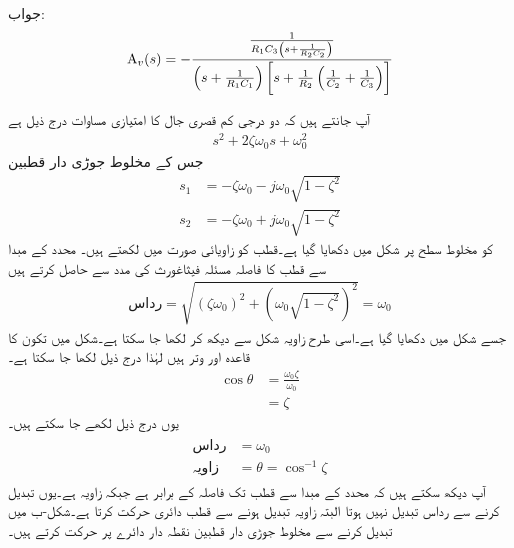 جواب:
\begin{align*}
{\ensuremath{{\textup{A}}}}_v(s)=-\frac{\frac{1}{R_1 C_3 \left(s+\frac{1}{R_2 C_2}\right)}}{\left(s+\frac{1}{R_1C_1}\right)\left[s+\frac{1}{R_2}\left(\frac{1}{C_2}+\frac{1}{C_3}\right)\right]}
\end{align*}

آپ جانتے ہیں کہ دو درجی کم قصری جال کا امتیازی مساوات درج ذیل ہے
\begin{align*}
s^2+2\zeta \omega_0 s+\omega_0^2
\end{align*}
جس کے مخلوط جوڑی دار قطبین
\begin{align*}
s_1&=-\zeta \omega_0-j\omega_0 \sqrt{1-\zeta^2}\\
s_2&=-\zeta \omega_0+j\omega_0 \sqrt{1-\zeta^2}
\end{align*}
کو مخلوط سطح پر شکل  میں دکھایا گیا ہے۔قطب  کو زاویائی صورت میں لکھتے ہیں۔ محدد کے مبدا  سے قطب کا فاصلہ مسئلہ فیثاغورث کی مدد سے حاصل کرتے ہیں
\begin{align*}
\text{رداس}=\sqrt{(\zeta \omega_0)^2+\left(\omega_0\sqrt{1-\zeta^2}\right)^2}=\omega_0
\end{align*}
جسے شکل میں   دکھایا گیا ہے۔اسی طرح زاویہ  شکل سے دیکھ کر لکھا جا سکتا ہے۔شکل میں تکون کا قاعدہ  اور وتر  ہیں لہٰذا درج ذیل لکھا جا سکتا ہے۔
\begin{align*}
\cos \theta&=\frac{\omega_0 \zeta}{\omega_0}\\
&=\zeta
\end{align*}
یوں درج ذیل لکھے جا سکتے ہیں۔
\begin{gather}
\begin{aligned}
\text{رداس}&=\omega_0\\
\text{زاویہ}&=\theta=\cos^{-1} \zeta
\end{aligned}
\end{gather}
آپ دیکھ سکتے ہیں کہ محدد کے مبدا سے قطب تک فاصلہ  کے برابر ہے جبکہ زاویہ  ہے۔یوں  تبدیل کرنے سے رداس تبدیل نہیں ہوتا البتہ زاویہ تبدیل ہونے سے قطب دائری حرکت کرتا ہے۔شکل-ب میں  تبدیل کرنے سے مخلوط جوڑی دار قطبین نقطہ دار دائرے پر حرکت کرتے ہیں۔
